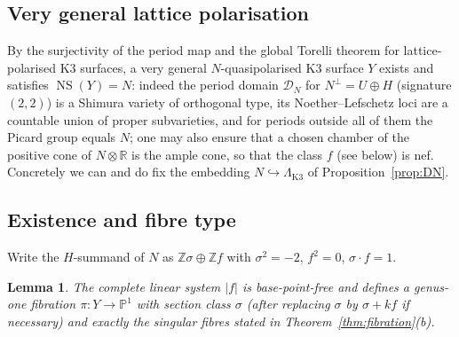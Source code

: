 \documentclass[11pt]{article}
\newtheorem{lemma}[theorem]{Lemma}
\newcommand{\PP}{\mathbb{P}}
\newcommand{\bZ}{\mathbb{Z}}
\newcommand{\bR}{\mathbb{R}}
\DeclareMathOperator{\NS}{NS}
\begin{document}
\subsection{Very general lattice polarisation}

By the surjectivity of the period map and the global Torelli theorem for
lattice-polarised K3 surfaces, a very general $N$-quasipolarised K3 surface
$Y$ exists and satisfies $\NS(Y)=N$: indeed the period domain
$\mathcal D_N$ for $N^{\perp}=U\oplus H$ (signature $(2,2)$) is a Shimura
variety of orthogonal type, its Noether--Lefschetz loci are a countable
union of proper subvarieties, and for periods outside all of them the
Picard group equals $N$; one may also ensure that a chosen chamber of the
positive cone of $N\otimes\bR$ is the ample cone, so that the class $f$ (see
below) is nef. Concretely we can and do fix the embedding
$N\hookrightarrow\Lambda_{\mathrm{K3}}$ of Proposition~\ref{prop:DN}.

\subsection{Existence and fibre type}

Write the $H$-summand of $N$ as $\bZ\sigma\oplus\bZ f$ with
$\sigma^2=-2$, $f^2=0$, $\sigma\cdot f=1$.

\begin{lemma}\label{lem:fibration}
The complete linear system $|f|$ is base-point-free and defines a genus-one
fibration $\pi\colon Y\to\PP^1$ with section class $\sigma$ (after replacing
$\sigma$ by $\sigma+kf$ if necessary) and exactly the singular fibres stated
in Theorem~\ref{thm:fibration}(b).
\end{lemma}
\end{document}
